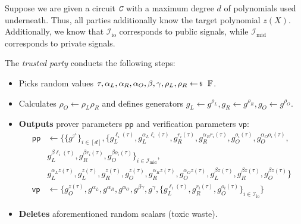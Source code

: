 \documentclass[../lecture-notes-148x210.tex]{subfiles}
\begin{document}
\begin{tcolorbox}[title=Pinocchio Protocol,
    breakable,
    colback=blue!5!white,
    colframe=blue!75!black,
    colbacktitle=blue!25!white,
    coltitle=blue!20!black,
    fonttitle=\bfseries,
    boxrule=1.25pt,
    subtitle style={boxrule=0pt,
    colback=blue!20!white,
    colupper=blue!75!gray} ]
    \small
    Suppose we are given a circuit $\textit{\texttt{C}}$ with a maximum degree $d$ of polynomials used underneath. Thus, all parties additionally know the target polynomial $z(X)$. Additionally, we know that $\mathcal{I}_{\text{io}}$ corresponds to public signals, while $\mathcal{I}_{\text{mid}}$ corresponds to private signals.

    The \emph{trusted party} conducts the following steps:
    \begin{itemize}[label=]
        \item Picks random values $\tau, \alpha_L, \alpha_R, \alpha_O, \beta, \gamma, \rho_L, \rho_R \leftarrowS \mathbb{F}$.
        \item Calculates $\rho_O \gets \rho_L\rho_R$ and defines generators $g_L \gets g^{\rho_L}, g_R \gets g^{\rho_R}, g_O \gets g^{\rho_O}$.
        \item \textbf{Outputs} prover parameters $\mathsf{pp}$ and verification parameters $\mathsf{vp}$:
        \begin{align*}
            \mathsf{pp} &\gets \big\{\{g^{\tau^i}\}_{i \in [d]}, \{g_L^{\ell_i(\tau)}, g_L^{\alpha_L\ell_i(\tau)}, g_R^{r_i(\tau)}, g_R^{\alpha_Rr_i(\tau)}, g_O^{o_i(\tau)}, g_O^{\alpha_O o_i(\tau)}, \\ 
            & g_L^{\beta \ell_i(\tau)}, g_R^{\beta r_i(\tau)}, g_O^{\beta o_i(\tau)}\}_{i \in \mathcal{I}_{\text{mid}}}, \\ 
            & g_L^{\alpha_L z(\tau)}, g_L^{z(\tau)}, g_R^{z(\tau)}, g_O^{z(\tau)}, g_R^{\alpha_R z(\tau)}, g_O^{\alpha_O z(\tau)}, g_L^{\beta z(\tau)}, g_R^{\beta z(\tau)}, g_O^{\beta z(\tau)}\big\} \\
            \mathsf{vp} &\gets \big\{ g_O^{z(\tau)}, g^{\alpha_L}, g^{\alpha_R}, g^{\alpha_O}, g^{\beta\gamma}, g^{\gamma}, \{g_L^{\ell_i(\tau)}, g_R^{r_i(\tau)}, g_O^{o_i(\tau)}\}_{i \in \mathcal{I}_{\text{io}}} \big\}
        \end{align*}
        \item \textbf{Deletes} aforementioned random scalars (toxic waste).
    \end{itemize}

\end{tcolorbox}
\end{document}
